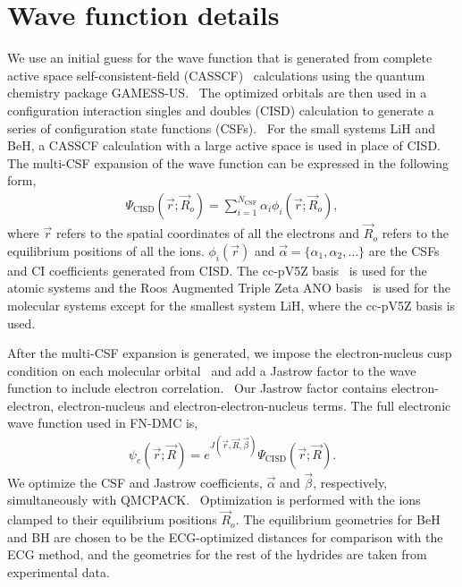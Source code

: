 \documentclass[aip,jcp,numerical,reprint]{revtex4-1}
\begin{document}
\section{ Wave function details}
We use an initial guess for the wave function that is generated from complete active space self-consistent-field (CASSCF)~\cite{Chaban_MCSCF,Szabo} calculations using the quantum chemistry package GAMESS-US.~\cite{GAMESS} The optimized orbitals are then used in a configuration interaction singles and doubles (CISD) calculation to generate a series of configuration state functions (CSFs).~\cite{Pauncz_CSF} For the small systems LiH and BeH, a CASSCF calculation with a large active space is used in place of CISD. The multi-CSF expansion of the wave function can be expressed in the following form,
\begin{align}
\Psi_{\text{CISD}}(\vec{r};\vec{R}_o)=\sum\limits_{i=1}^{N_{\text{CSF}}}\alpha_i\phi_i(\vec{r};\vec{R}_o), \label{eq:psi_gms}
\end{align}
where $\vec{r}$ refers to the spatial coordinates of all the electrons and $\vec{R}_o$ refers to the equilibrium positions of all the ions. $\phi_i(\vec{r})$ and $\vec{\alpha}=\{\alpha_1,\alpha_2,\dots\}$ are the CSFs and CI coefficients generated from CISD. The cc-pV5Z basis~\cite{dunning} is used for the atomic systems and the Roos Augmented Triple Zeta ANO basis~\cite{roos} is used for the molecular systems except for the smallest system LiH, where the cc-pV5Z basis is used.

After the multi-CSF expansion is generated, we impose the electron-nucleus cusp condition on each molecular orbital~\cite{cusp} and add a Jastrow factor to the wave function to include electron correlation.~\cite{Kato} Our Jastrow factor contains electron-electron, electron-nucleus and electron-electron-nucleus terms. The full electronic wave function used in FN-DMC is,
\begin{align}
\psi_e(\vec{r};\vec{R})=e^{J(\vec{r},\vec{R},\vec{\beta})}\Psi_{\text{CISD}}(\vec{r};\vec{R})\label{eq:psie}.
\end{align}
We optimize the CSF and Jastrow coefficients, $\vec{\alpha}$ and $\vec{\beta}$, respectively, simultaneously with QMCPACK.~\cite{QMCPACK_Kim,QMCPACK_Esler} Optimization is performed with the ions clamped to their equilibrium positions $\vec{R}_o$. The equilibrium geometries for BeH and BH are chosen to be the ECG-optimized distances for comparison with the ECG  method, and the geometries for the rest of the hydrides are taken from experimental data.
\end{document}
